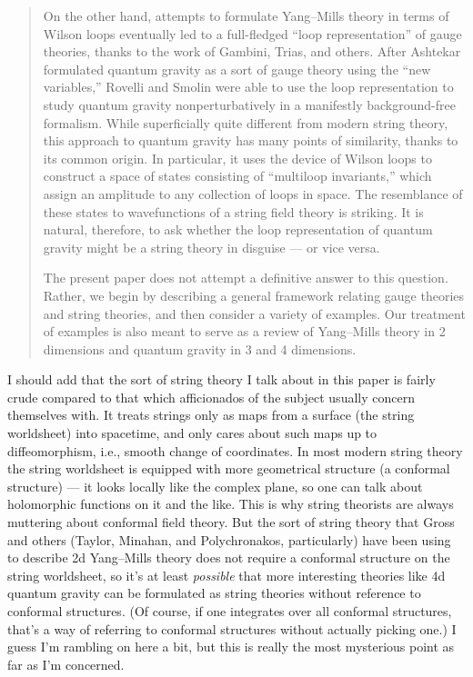 \documentclass[12pt]{article}
\begin{document}
\begin{quote}
On the other hand, attempts to formulate Yang--Mills theory in terms of
Wilson loops eventually led to a full-fledged ``loop representation'' of
gauge theories, thanks to the work of Gambini, Trias, and others. After
Ashtekar formulated quantum gravity as a sort of gauge theory using the
``new variables,'' Rovelli and Smolin were able to use the loop
representation to study quantum gravity nonperturbatively in a
manifestly background-free formalism. While superficially quite
different from modern string theory, this approach to quantum gravity
has many points of similarity, thanks to its common origin. In
particular, it uses the device of Wilson loops to construct a space of
states consisting of ``multiloop invariants,'' which assign an amplitude
to any collection of loops in space. The resemblance of these states to
wavefunctions of a string field theory is striking. It is natural,
therefore, to ask whether the loop representation of quantum gravity
might be a string theory in disguise --- or vice versa.

The present paper does not attempt a definitive answer to this question.
Rather, we begin by describing a general framework relating gauge
theories and string theories, and then consider a variety of examples.
Our treatment of examples is also meant to serve as a review of
Yang--Mills theory in 2 dimensions and quantum gravity in 3 and 4
dimensions.
\end{quote}

I should add that the sort of string theory I talk about in this paper
is fairly crude compared to that which afficionados of the subject
usually concern themselves with. It treats strings only as maps from a
surface (the string worldsheet) into spacetime, and only cares about
such maps up to diffeomorphism, i.e., smooth change of coordinates. In
most modern string theory the string worldsheet is equipped with more
geometrical structure (a conformal structure) --- it looks locally like
the complex plane, so one can talk about holomorphic functions on it and
the like. This is why string theorists are always muttering about
conformal field theory. But the sort of string theory that Gross and
others (Taylor, Minahan, and Polychronakos, particularly) have been
using to describe 2d Yang--Mills theory does not require a conformal
structure on the string worldsheet, so it's at least \emph{possible}
that more interesting theories like 4d quantum gravity can be formulated
as string theories without reference to conformal structures. (Of
course, if one integrates over all conformal structures, that's a way of
referring to conformal structures without actually picking one.) I guess
I'm rambling on here a bit, but this is really the most mysterious point
as far as I'm concerned.
\end{document}
